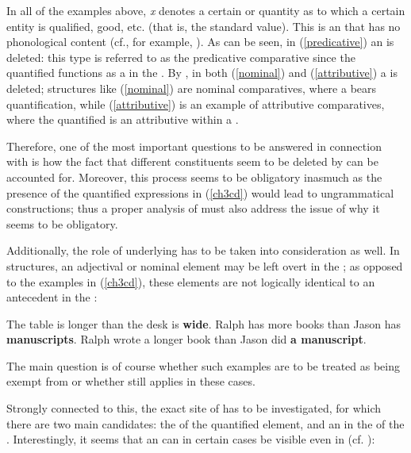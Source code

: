 In all of the examples above, \textit{x} denotes a certain  or quantity as to which a certain entity is qualified, good, etc. (that is, the standard value). This is an  that has no phonological content (cf., for example, \citealt{chomsky1977}). As can be seen, in (\ref{predicative}) an  is deleted: this type is referred to as the predicative comparative since the quantified  functions as a  in the . By , in both (\ref{nominal}) and (\ref{attributive}) a  is deleted; structures like (\ref{nominal}) are nominal comparatives, where a  bears quantification, while (\ref{attributive}) is an example of attributive comparatives, where the quantified  is an attributive  within a .

Therefore, one of the most important questions to be answered in connection with  is how the fact that different constituents seem to be deleted by  can be accounted for. Moreover, this  process seems to be obligatory inasmuch as the presence of the quantified expressions in (\ref{ch3cd}) would lead to ungrammatical constructions; thus a proper analysis of  must also address the issue of why it seems to be obligatory.

Additionally, the role of  underlying  has to be taken into consideration as well. In  structures, an adjectival or nominal element may be left overt in the ; as opposed to the examples in (\ref{ch3cd}), these elements are not logically identical to an antecedent in the :

\ea \label{subcompparadigm}
\ea The table is longer than the desk is \textbf{wide}.\label{ch3subcomp}
\ex Ralph has more books than Jason has \textbf{manuscripts}.
\ex Ralph wrote a longer book than Jason did \textbf{a manuscript}.
\z
\z

The main question is of course whether such examples are to be treated as being exempt from  or whether  still applies in these cases.

Strongly connected to this, the exact site of  has to be investigated, for which there are two main candidates: the  of the quantified element, and an  in the  of the . Interestingly, it seems that an  can in certain cases be visible even in  (cf. \citealt{chomsky1977}):

